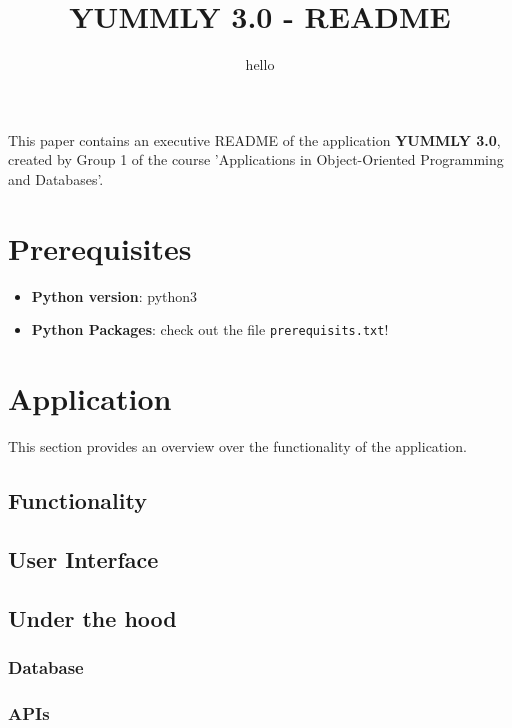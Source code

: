\documentclass[11pt,a4paper,notitlepage]{article}
\title{YUMMLY 3.0 -  README}
\subtitle{hello}
\date{\vspace{-5ex}}
\author{\vspace{-5ex}}
\begin{document}
\maketitle
\thispagestyle{fancy}

This paper contains an executive README of the application \textbf{ YUMMLY 3.0}, created by Group 1 of the course 'Applications in Object-Oriented Programming and Databases'.

\section*{Prerequisites}
\begin{itemize}  
\item\textbf{Python version}: python3
\item \textbf{Python Packages}: check out the file \texttt{prerequisits.txt}!
\end{itemize}
 
\section*{Application}
This section provides an overview over the functionality of the application.
\subsection*{Functionality}
\subsection*{User Interface}
\subsection*{Under the hood}
\subsubsection*{Database}
\subsubsection*{APIs}
\end{document}
